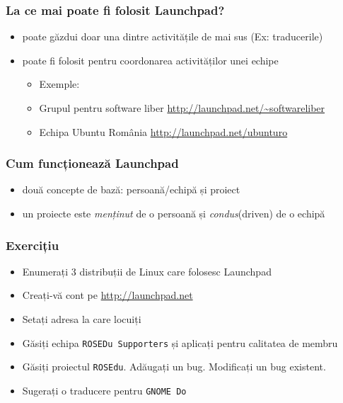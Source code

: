 \documentclass{beamer}
\begin{document}
\begin{frame}
\frametitle{La ce mai poate fi folosit Launchpad?}
\begin{itemize}
\item poate găzdui doar una dintre activitățile de mai sus (Ex: traducerile)
\item poate fi folosit pentru coordonarea activităților unei echipe
\begin{itemize}
\item Exemple: 
\item Grupul pentru software liber \url{http://launchpad.net/~softwareliber}
\item Echipa Ubuntu România \url{http://launchpad.net/ubunturo}
\end{itemize}
\end{itemize}
\end{frame}

\begin{frame}
\frametitle{Cum funcționează Launchpad}
\begin{itemize}
\item două concepte de bază: persoană/echipă și proiect
\item un proiecte este \emph{menținut} de o persoană și \emph{condus}(driven) de o echipă
\end{itemize}
\end{frame}

\begin{frame}
\frametitle{Exercițiu}
\begin{itemize}
\item Enumerați 3 distribuții de Linux care folosesc Launchpad
\item Creați-vă cont pe \url{http://launchpad.net}
\item Setați adresa la care locuiți
\item Găsiți echipa \texttt{ROSEDu Supporters} și aplicați pentru calitatea de membru
\item Găsiți proiectul \texttt{ROSEdu}. Adăugați un bug. Modificați un bug existent.
\item Sugerați o traducere pentru \texttt{GNOME Do} %
\end{itemize}
\end{frame}
\end{document}
